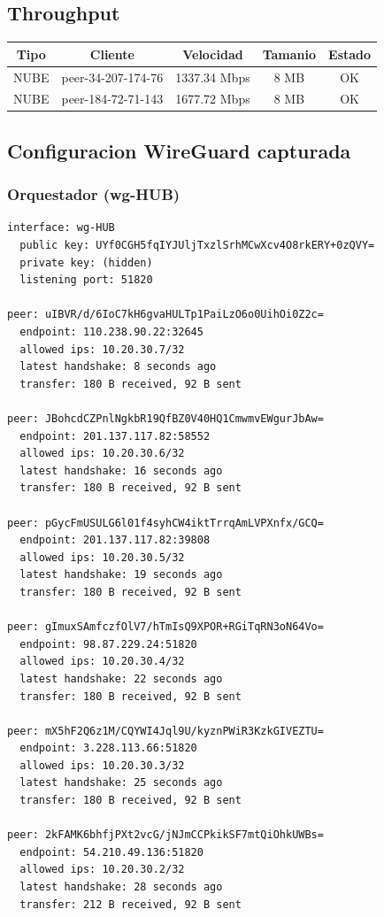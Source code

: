 \documentclass[11pt,a4paper]{article}
\begin{document}
\subsection{Throughput}
\begin{longtable}{|c|c|c|c|c|}
\hline
Tipo & Cliente & Velocidad & Tamanio & Estado \\ \hline
NUBE & peer-34-207-174-76 & 1337.34 Mbps & 8 MB & OK \\ \hline
NUBE & peer-184-72-71-143 & 1677.72 Mbps & 8 MB & OK \\ \hline
\end{longtable}

\subsection{Configuracion WireGuard capturada}
\subsubsection*{Orquestador (wg-HUB)}
\begin{lstlisting}
interface: wg-HUB
  public key: UYf0CGH5fqIYJUljTxzlSrhMCwXcv4O8rkERY+0zQVY=
  private key: (hidden)
  listening port: 51820

peer: uIBVR/d/6IoC7kH6gvaHULTp1PaiLzO6o0UihOi0Z2c=
  endpoint: 110.238.90.22:32645
  allowed ips: 10.20.30.7/32
  latest handshake: 8 seconds ago
  transfer: 180 B received, 92 B sent

peer: JBohcdCZPnlNgkbR19QfBZ0V40HQ1CmwmvEWgurJbAw=
  endpoint: 201.137.117.82:58552
  allowed ips: 10.20.30.6/32
  latest handshake: 16 seconds ago
  transfer: 180 B received, 92 B sent

peer: pGycFmUSULG6l01f4syhCW4iktTrrqAmLVPXnfx/GCQ=
  endpoint: 201.137.117.82:39808
  allowed ips: 10.20.30.5/32
  latest handshake: 19 seconds ago
  transfer: 180 B received, 92 B sent

peer: gImuxSAmfczfOlV7/hTmIsQ9XPOR+RGiTqRN3oN64Vo=
  endpoint: 98.87.229.24:51820
  allowed ips: 10.20.30.4/32
  latest handshake: 22 seconds ago
  transfer: 180 B received, 92 B sent

peer: mX5hF2Q6z1M/CQYWI4Jql9U/kyznPWiR3KzkGIVEZTU=
  endpoint: 3.228.113.66:51820
  allowed ips: 10.20.30.3/32
  latest handshake: 25 seconds ago
  transfer: 180 B received, 92 B sent

peer: 2kFAMK6bhfjPXt2vcG/jNJmCCPkikSF7mtQiOhkUWBs=
  endpoint: 54.210.49.136:51820
  allowed ips: 10.20.30.2/32
  latest handshake: 28 seconds ago
  transfer: 212 B received, 92 B sent

\end{lstlisting}
\end{document}
